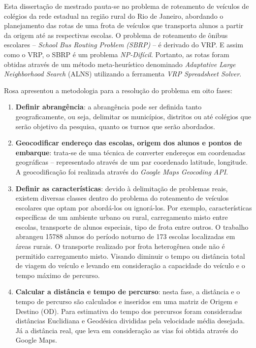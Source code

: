 Esta dissertação de mestrado pauta-se no problema de roteamento de veículos de colégios da rede estadual na região rural do Rio de Janeiro, abordando o planejamento das rotas de uma frota de veículos que transporta alunos a partir da origem até as respectivas escolas. O problema de roteamento de ônibus escolares -- \emph{School Bus Routing Problem (SBRP)} -- é derivado do VRP. E assim como o VRP, o SBRP é um problema \emph{NP-Difícil}. Portanto, as rotas foram obtidas através de um método meta-heurístico denominado \emph{Adaptative Large Neighborhood Search} (ALNS) utilizando a ferramenta \emph{VRP Spreadsheet Solver}.

Rosa \citeyear{maxwell} apresentou a metodologia para a resolução do problema em oito fases:
\begin{enumerate}
    \item \textbf{Definir abrangência}: a abrangência pode ser definida tanto geograficamente, ou seja, delimitar os municípios, distritos ou até colégios que serão objetivo da pesquisa, quanto os turnos que serão abordados.
    
    \item \textbf{Geocodificar endereço das escolas, origem dos alunos e pontos de embarque}: trata-se de uma técnica de converter endereços em coordenadas geográficas -- representado através de um par coordenado latitude, longitude. A geocodificação foi realizada através do \emph{Google Maps Geocoding API}.
    
    \item \textbf{Definir as características}: devido à delimitação de problemas reais, existem diversas classes dentro do problema do roteamento de veículos escolares que optam por abordá-los ou ignorá-los. Por exemplo, características específicas de um ambiente urbano ou rural, carregamento misto entre escolas, transporte de alunos especiais, tipo de frota entre outros. O trabalho abrangeu 15788 alunos do período noturno de 173 escolas localizadas em áreas rurais. O transporte realizado por frota heterogênea onde não é permitido carregamento misto. Visando diminuir o tempo ou distância total de viagem do veículo e levando em consideração a capacidade do veículo e o tempo máximo de percurso.
    
    \item \textbf{Calcular a distância e tempo de percurso}: nesta fase, a distância e o tempo de percurso são calculados e inseridos em uma matriz de Origem e Destino (OD). Para estimativa do tempo dos percursos foram consideradas distâncias Euclidiana e Geodésica divididas pela velocidade média desejada. Já a distância real, que leva em consideração as vias foi obtida através do Google Maps.
    

\end{enumerate}
